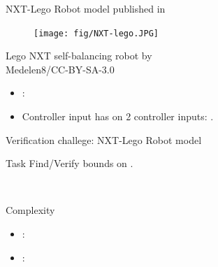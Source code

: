 \begin{frame}{NXT-Lego Robot model}
 published in  %

\begin{minipage}{0.3\textwidth}
\begin{figure}
\centering
\texttt{[image: fig/NXT-lego.JPG]}
\end{figure}
\end{minipage}
\begin{minipage}{0.6\textwidth}
{\footnotesize Lego NXT self-balancing robot by\\ Medelen8/CC-BY-SA-3.0}
\begin{itemize}
\item {}:
\item Controller input has  on {\color{violet} 2 controller inputs}: .
\end{itemize}
\end{minipage}

\end{frame}


\begin{frame}{Verification challege: NXT-Lego Robot model}
\begin{alertblock}{Task}
Find/Verify bounds on .
\end{alertblock}
%
\\
%
\begin{block}{Complexity}
\begin{itemize}
\item {}: 
\item {}: 
\end{itemize}
\end{block}
%
\end{frame}

